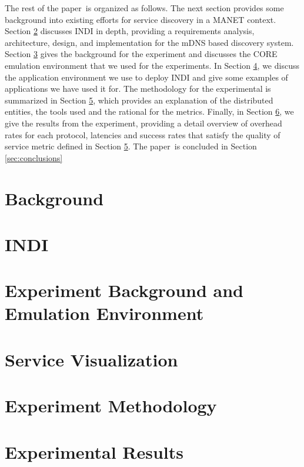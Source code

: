 \documentclass[preprint,12pt]{elsarticle}
\newcommand{\doctype}{paper}
\begin{document}
The rest of the \doctype~is organized as follows. The next section provides some background into existing efforts for service discovery in a MANET context. Section \ref{sec:indi} discusses INDI in depth, providing a requirements analysis, architecture, design,  and implementation for the mDNS based discovery system.  Section \ref{sec:core} gives the background for the experiment and discusses the CORE emulation environment that we used for the experiments.  In Section \ref{sec:protosd}, we discuss the application environment we use to deploy INDI and give some examples of applications we have used it for.  The methodology for the experimental is summarized in Section \ref{sec:methodology}, which provides  an explanation of the distributed entities, the tools used and the rational for the metrics.  Finally, in Section \ref{sec:results}, we give the results from the experiment, providing a detail overview of overhead rates for each protocol, latencies and success rates that satisfy the quality of service metric defined in Section \ref{sec:methodology}. The \doctype~is concluded in Section \ref{sec:conclusions}  

\section{Background}
\label{sec:background}


\section{INDI}
\label{sec:indi}


\section{Experiment Background and Emulation Environment}
\label{sec:core}


\section{Service Visualization}
\label{sec:protosd}


\section{Experiment Methodology}
\label{sec:methodology}


\section{Experimental Results}
\label{sec:results}










\end{document}
